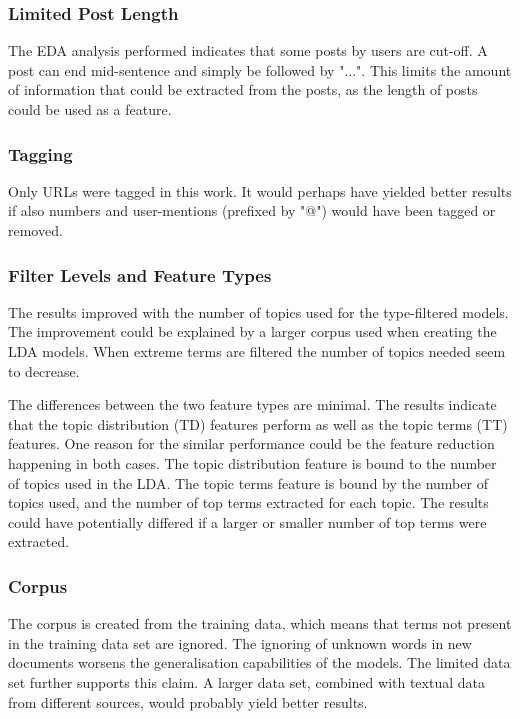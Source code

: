 \subsubsection{Limited Post Length}
The EDA analysis performed indicates that some posts by users are cut-off.
A post can end mid-sentence and simply be followed by "$\ldots$".
This limits the amount of information that could be extracted from the posts, as the length of posts could be used as a feature.

\subsubsection{Tagging}
Only URLs were tagged in this work.
It would perhaps have yielded better results if also numbers and user-mentions (prefixed by "@") would have been tagged or removed.

\subsubsection{Filter Levels and Feature Types}
The results improved with the number of topics used for the type-filtered models.
The improvement could be explained by a larger corpus used when creating the LDA models.
When extreme terms are filtered the number of topics needed seem to decrease.

The differences between the two feature types are minimal.
The results indicate that the topic distribution (TD) features perform as well as the topic terms (TT) features.
One reason for the similar performance could be the feature reduction happening in both cases.
The topic distribution feature is bound to the number of topics used in the LDA.
The topic terms feature is bound by the number of topics used, and the number of top terms extracted for each topic.
The results could have potentially differed if a larger or smaller number of top terms were extracted.

\subsubsection{Corpus}
The corpus is created from the training data, which means that terms not present in the training data set are ignored.
The ignoring of unknown words in new documents worsens the generalisation capabilities of the models.
The limited data set further supports this claim.
A larger data set, combined with textual data from different sources, would probably yield better results.


